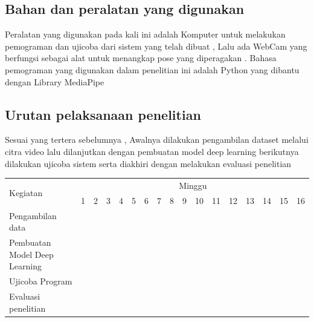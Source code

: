 \subsection{Bahan dan peralatan yang digunakan}

Peralatan yang digunakan pada kali ini adalah Komputer untuk melakukan pemograman dan ujicoba dari sistem yang telah dibuat , Lalu ada WebCam yang berfungsi sebagai alat untuk menangkap pose yang diperagakan . Bahasa pemograman yang digunakan dalam penelitian ini adalah Python yang dibantu dengan Library MediaPipe

\subsection{Urutan pelaksanaan penelitian}
Sesuai yang tertera sebelumnya , Awalnya dilakukan pengambilan dataset melalui citra video lalu dilanjutkan dengan pembuatan model deep learning berikutnya dilakukan ujicoba sistem serta diakhiri dengan melakukan evaluasi penelitian

\newcommand{\w}{}
\newcommand{\G}{\cellcolor{gray}}
\begin{table}[h!]
  \begin{tabular}{|p{3.5cm}|c|c|c|c|c|c|c|c|c|c|c|c|c|c|c|c|}

    \hline
    \multirow{2}{*}{Kegiatan} & \multicolumn{16}{|c|}{Minggu} \\
    \cline{2-17} &
    1 & 2 & 3 & 4 & 5 & 6 & 7 & 8 & 9 & 10 & 11 & 12 & 13 & 14 & 15 & 16 \\
    \hline

    Pengambilan data &
    \G & \G & \G & \G & \w & \w & \w & \w & \w & \w & \w & \w & \w & \w & \w & \w \\
    \hline

    Pembuatan Model Deep Learning &
    \w & \w & \w & \w & \G & \G & \G & \G & \w & \w & \w & \w & \w & \w & \w & \w \\
    \hline

    Ujicoba Program &
    \w & \w & \w & \w & \w & \w & \w & \w & \G & \G & \G & \G & \w & \w & \w & \w \\
    \hline

    Evaluasi penelitian &
    \w & \w & \w & \w & \w & \w & \w & \w & \w & \w & \w & \w & \G & \G & \G & \G \\
    \hline

  \end{tabular}
\end{table}